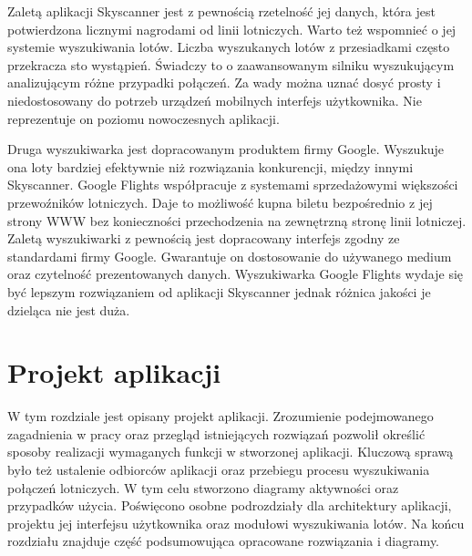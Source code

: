 \documentclass[12pt, twoside]{report}
\begin{document}
Zaletą aplikacji Skyscanner jest z pewnością rzetelność jej danych, która jest potwierdzona licznymi nagrodami od linii lotniczych. Warto też wspomnieć o jej systemie wyszukiwania lotów. Liczba wyszukanych lotów z przesiadkami często przekracza sto wystąpień. Świadczy to o zaawansowanym silniku wyszukującym  analizującym różne przypadki połączeń. Za wady można uznać dosyć prosty i niedostosowany do potrzeb urządzeń mobilnych interfejs użytkownika. Nie reprezentuje on poziomu nowoczesnych aplikacji. 

Druga wyszukiwarka jest dopracowanym produktem firmy Google. Wyszukuje ona loty bardziej efektywnie niż rozwiązania konkurencji, między innymi Skyscanner. Google Flights współpracuje z systemami sprzedażowymi większości przewoźników lotniczych. Daje to możliwość kupna biletu bezpośrednio z jej strony WWW bez konieczności przechodzenia na zewnętrzną stronę linii lotniczej. Zaletą wyszukiwarki z pewnością jest dopracowany interfejs zgodny ze standardami firmy Google. Gwarantuje on dostosowanie do używanego medium oraz czytelność prezentowanych danych. Wyszukiwarka Google Flights wydaje się być lepszym rozwiązaniem od aplikacji Skyscanner jednak różnica jakości je dzieląca nie jest duża.

\chapter{Projekt aplikacji}
W tym rozdziale jest opisany projekt aplikacji. Zrozumienie podejmowanego zagadnienia w pracy oraz przegląd istniejących rozwiązań pozwolił określić sposoby realizacji wymaganych funkcji w stworzonej aplikacji.  Kluczową sprawą było też ustalenie odbiorców aplikacji oraz przebiegu procesu wyszukiwania połączeń lotniczych. W tym celu stworzono diagramy aktywności oraz przypadków użycia. Poświęcono osobne podrozdziały dla architektury aplikacji, projektu jej interfejsu użytkownika oraz modułowi wyszukiwania lotów. Na końcu rozdziału znajduje część podsumowująca opracowane rozwiązania i diagramy.
\end{document}
